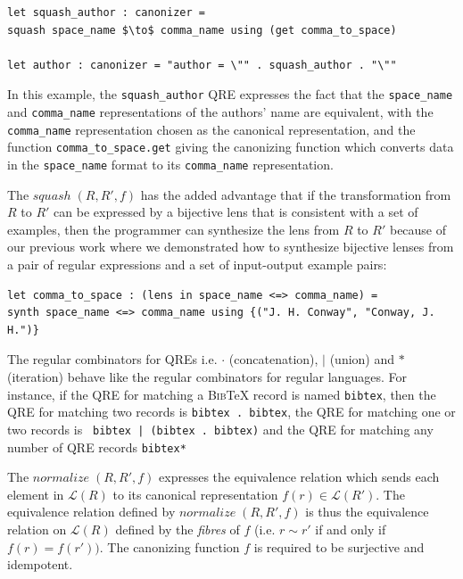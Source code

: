 \documentclass{svproc}
\newcommand{\cd}[1]{\lstinline[backgroundcolor=\color{white}]$#1$}
\newcommand{\squash}[3]{\ensuremath{\mathit{squash} \; (#1, #2, #3)}}
\newcommand{\normalize}[3]{\ensuremath{\mathit{normalize} \; (#1, #2, #3)}}
\newcommand{\bibtex}{\textsc{Bib}\TeX{}}
\begin{document}
\begin{lstlisting}
let squash_author : canonizer =  
squash space_name $\to$ comma_name using (get comma_to_space)

let author : canonizer = "author = \"" . squash_author . "\""
\end{lstlisting}

In this example, the \cd{squash_author} QRE expresses the fact that the
\cd{space_name} and \cd{comma_name} representations of the authors' name
are equivalent, with the \cd{comma_name} representation chosen as the
canonical representation, and the function \cd{comma_to_space.get} giving
the canonizing function which converts data in the \cd{space_name} format
to its \cd{comma_name} representation.

The $\squash{R}{R'}{f}$ has the added advantage that if the transformation from
$R$ to $R'$ can be expressed by a bijective lens that is consistent with a set
of examples, then the programmer can synthesize the lens from $R$ to $R'$
because of our previous work where we demonstrated how to synthesize bijective
lenses from a pair of regular expressions and a set of input-output example
pairs:

\begin{lstlisting}
let comma_to_space : (lens in space_name <=> comma_name) = 
synth space_name <=> comma_name using {("J. H. Conway", "Conway, J. H.")}
\end{lstlisting}

The regular combinators for QREs i.e. $\cdot$ (concatenation), $|$ (union) and
$*$ (iteration) behave like the regular combinators for regular languages. For
instance, if the QRE for matching a \bibtex{} record is named
\cd{bibtex}, then the QRE for matching two records is 
\cd{bibtex . bibtex}, the QRE for matching one or two records is
\cd{ bibtex | (bibtex . bibtex)} and the QRE for matching any number of QRE
records \cd{bibtex*}

The $\normalize{R}{R'}{f}$ expresses the equivalence relation which sends each
element in $\mathcal{L}(R)$ to its canonical representation $f(r) \in
\mathcal{L}(R')$. The equivalence relation defined by
$\normalize{R}{R'}{f}$ is thus the equivalence relation on
$\mathcal{L}(R)$ defined by the {\em fibres} of $f$ (i.e. $r \sim r'$ if and
only if $f(r) = f(r'))$. The canonizing function $f$ is required to be
surjective and idempotent.
\end{document}
